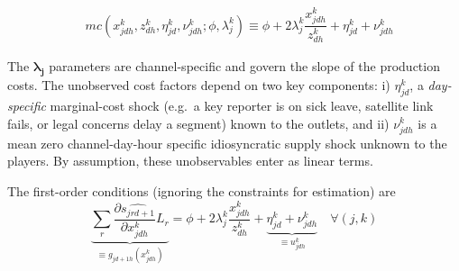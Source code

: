 \documentclass[12pt]{article}
\begin{document}
	\begin{equation*}\label{}
		\begin{aligned}
			& mc(x_{jdh}^k,z_{dh}^k,\eta_{jd}^k,\nu_{jdh}^k; \phi,\lambda_j^k )\equiv   \phi +   2\lambda_j^k  \dfrac{x_{jdh}^k}{z_{dh}^k} + \eta_{jd}^k + \nu_{jdh}^k
		\end{aligned}
	\end{equation*} 
	
	
	
	
	The $\bm{\lambda_j}$ parameters are channel-specific and govern the slope of the production costs. The unobserved cost factors depend on two key components: i)
	$\eta_{jd}^k$, a \emph{ day-specific} marginal-cost shock
	(e.g.\ a key reporter is on sick leave, satellite link fails, or legal concerns delay a segment) known to the outlets,
	and ii) $\nu_{jdh}^k$ is a mean zero channel-day-hour specific idiosyncratic supply shock unknown to the players. By assumption, these unobservables enter as linear terms. 
	
	
	
	
	
	
	
	
	
	
	The first-order conditions (ignoring the  constraints for estimation) are
	\begin{equation}\label{eq:focs}
		\underbrace{\sum_{r}\frac{\partial \widehat{s_{jrd+1}}}{\partial x_{jdh}^k}L_r}_{\equiv g_{jd+1h}(x_{jdh}^k)}
		= \phi + 2\lambda_j^k\frac{x_{jdh}^k}{z_{dh}^k}  
		+ \underbrace{\eta_{jd}^k+\nu_{jdh}^k}_{\equiv u_{jdh}^k}
		\quad \forall(j,k)
	\end{equation}
	
\end{document}

